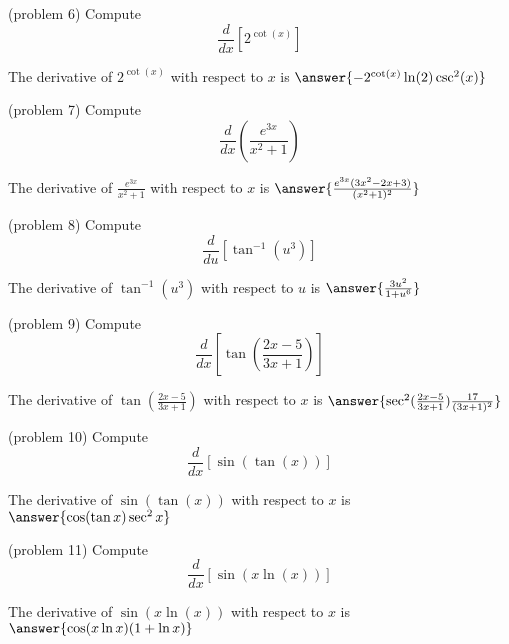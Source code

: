 \documentclass[handout]{ximera}
\begin{document}
\begin{problem}(problem 6)
  Compute
  \[
  \frac{d}{dx} \left[2^{\cot(x)}\right]
  \]
  
    
    
		The derivative of $2^{\cot(x)}$ with respect to $x$ is
		 $\answer{-2^{\cot(x)}\ln(2)\csc^2(x)}$
		
\end{problem}



\begin{problem}(problem 7)
  Compute
  \[
  \frac{d}{dx} \left(\frac{e^{3x}}{x^2 + 1}\right)
  \]
  
    
		The derivative of $\frac{e^{3x}}{x^2 + 1}$ with respect to $x$ is
		 $\answer{\frac{e^{3x}(3x^2 -2x +3)}{(x^2 + 1)^2}}$
		
\end{problem}



\begin{problem}(problem 8)
  Compute
  \[
  \frac{d}{du} \left[\tan^{-1}(u^3)\right]
  \]
  
    
		The derivative of $\tan^{-1}(u^3)$ with respect to $u$ is
		 $\answer{\frac{3u^2}{1+u^6}}$
		
\end{problem}




\begin{problem}(problem 9)
  Compute
  \[
  \frac{d}{dx} \left[\tan\left(\frac{2x-5}{3x+1}\right)\right]
  \]
  
   
		The derivative of $\tan\left(\frac{2x-5}{3x+1}\right)$ with respect to $x$ is
		 $\answer{\sec^2(\frac{2x-5}{3x+1})\frac{17}{(3x+1)^2}}$
		
\end{problem}


\begin{problem}(problem 10)
  Compute
  \[
  \frac{d}{dx} \left[\sin(\tan (x))\right]
  \]
  
    
		The derivative of $\sin(\tan (x))$ with respect to $x$ is
		 $\answer{\cos(\tan x)\sec^2 x}$
		
\end{problem}



\begin{problem}(problem 11)
  Compute
  \[
  \frac{d}{dx} \left[\sin(x\ln (x))\right]
  \]
  
    
		The derivative of $\sin(x\ln (x))$ with respect to $x$ is
		 $\answer{\cos(x\ln x)(1+\ln x)}$
		
\end{problem}
\end{document}
